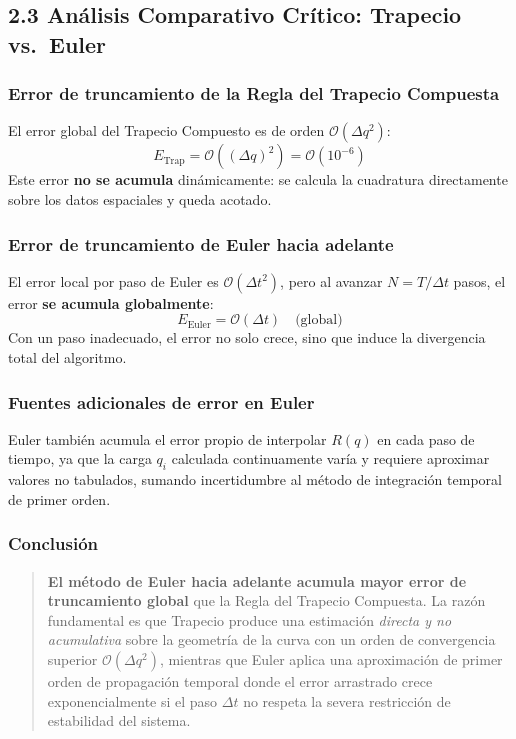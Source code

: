 \documentclass[12pt,a4paper]{article}
\begin{document}
\subsection{2.3 Análisis Comparativo Crítico: Trapecio vs.\ Euler}

\subsubsection*{Error de truncamiento de la Regla del Trapecio Compuesta}

El error global del Trapecio Compuesto es de orden $\mathcal{O}(\Delta q^2)$:
\begin{equation}
    E_{\text{Trap}} = \mathcal{O}\!\left((\Delta q)^2\right) = \mathcal{O}(10^{-6})
\end{equation}
Este error \textbf{no se acumula} dinámicamente: se calcula la cuadratura directamente sobre los datos espaciales y queda acotado.

\subsubsection*{Error de truncamiento de Euler hacia adelante}

El error local por paso de Euler es $\mathcal{O}(\Delta t^2)$, pero al avanzar
$N = T/\Delta t$ pasos, el error \textbf{se acumula globalmente}:
\begin{equation}
    E_{\text{Euler}} = \mathcal{O}\!\left(\Delta t\right) \quad \text{(global)}
\end{equation}
Con un paso inadecuado, el error no solo crece, sino que induce la divergencia total del algoritmo.

\subsubsection*{Fuentes adicionales de error en Euler}

Euler también acumula el error propio de interpolar $R(q)$ en cada paso de tiempo, ya que la carga $q_i$ calculada continuamente varía y requiere aproximar valores no tabulados, sumando incertidumbre al método de integración temporal de primer orden.

\subsubsection*{Conclusión}

\begin{quote}
    \textbf{El método de Euler hacia adelante acumula mayor error de
    truncamiento global} que la Regla del Trapecio Compuesta. La razón
    fundamental es que Trapecio produce una estimación \emph{directa y
    no acumulativa} sobre la geometría de la curva con un orden de convergencia superior $\mathcal{O}(\Delta q^2)$, mientras que
    Euler aplica una aproximación de primer orden de propagación temporal donde el error arrastrado crece exponencialmente si el paso $\Delta t$ no respeta la severa restricción de estabilidad del sistema.
\end{quote}
\end{document}
